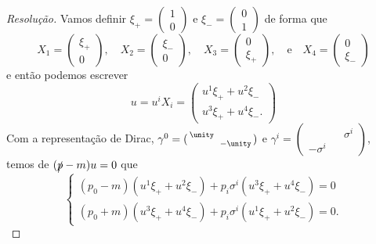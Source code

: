 \begin{proof}[Resolução]
    Vamos definir \(\xi_+ = (\begin{smallmatrix} 1\\0 \end{smallmatrix})\) e \(\xi_- = (\begin{smallmatrix}0\\1 \end{smallmatrix})\) de forma que
    \begin{equation*}
        X_1 = \begin{pmatrix}
            \xi_+\\0
        \end{pmatrix},\quad
        X_2 = \begin{pmatrix}
            \xi_-\\0
        \end{pmatrix},\quad
        X_3 = \begin{pmatrix}
            0\\\xi_+
        \end{pmatrix},\quad\text{e}\quad
        X_4 = \begin{pmatrix}
            0\\\xi_-
        \end{pmatrix}
    \end{equation*}
    e então podemos escrever
    \begin{equation*}
        u = u^i X_i = \begin{pmatrix}
            u^1 \xi_+ + u^2 \xi_-\\
            u^3 \xi_+ + u^4 \xi_-.
        \end{pmatrix}
    \end{equation*}
    Com a representação de Dirac, \(\gamma^0 = (\begin{smallmatrix} \unity &&\\ &&-\unity \end{smallmatrix})\) e \(\gamma^i = (\begin{smallmatrix} && \sigma^i\\ -\sigma^i && \end{smallmatrix})\), temos de \((\slashed{p} - m)u = 0\) que
    \begin{equation*}
        \begin{cases}
            (p_0 - m) (u^1 \xi_+ + u^2 \xi_-) + p_i \sigma^i (u^3 \xi_+ + u^4 \xi_-) = 0\\
            (p_0 + m) (u^3 \xi_+ + u^4 \xi_-) + p_i \sigma^i (u^1 \xi_+ + u^2 \xi_-) = 0.
        \end{cases}
    \end{equation*}

\end{proof}
